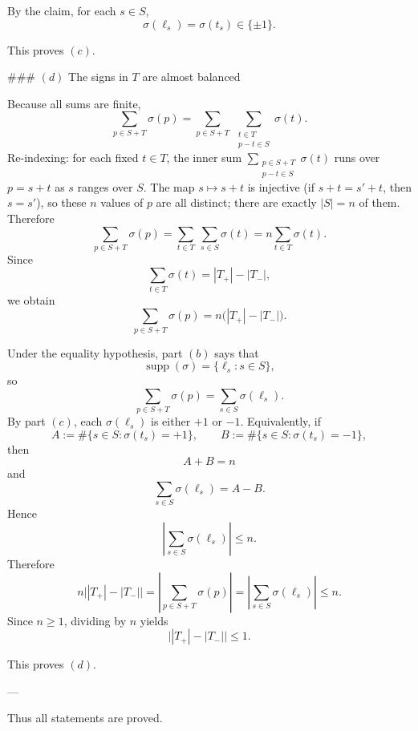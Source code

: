 By the claim, for each \(s\in S\),
\[
\sigma(\ell_s)=\sigma(t_s)\in\{\pm 1\}.
\]

This proves \((c)\).

### \((d)\) The signs in \(T\) are almost balanced

Because all sums are finite,
\[
\sum_{p\in S+T}\sigma(p)
=
\sum_{p\in S+T}\ \sum_{\substack{t\in T\\ p-t\in S}} \sigma(t).
\]
Re-indexing: for each fixed \(t\in T\), the inner sum \(\sum_{\substack{p\in S+T\\ p-t\in S}}\sigma(t)\) runs over \(p=s+t\) as \(s\) ranges over \(S\). The map \(s\mapsto s+t\) is injective (if \(s+t=s'+t\), then \(s=s'\)), so these \(n\) values of \(p\) are all distinct; there are exactly \(|S|=n\) of them. Therefore
\[
\sum_{p\in S+T}\sigma(p)
=
\sum_{t\in T}\ \sum_{s\in S}\sigma(t)
=
n\sum_{t\in T}\sigma(t).
\]
Since
\[
\sum_{t\in T}\sigma(t)=|T_+|-|T_-|,
\]
we obtain
\[
\sum_{p\in S+T}\sigma(p)=n\bigl(|T_+|-|T_-|\bigr).
\]

Under the equality hypothesis, part \((b)\) says that
\[
\operatorname{supp}(\sigma)=\{\ell_s:s\in S\},
\]
so
\[
\sum_{p\in S+T}\sigma(p)
=
\sum_{s\in S}\sigma(\ell_s).
\]
By part \((c)\), each \(\sigma(\ell_s)\) is either \(+1\) or \(-1\). Equivalently, if
\[
A:=\#\{s\in S:\sigma(t_s)=+1\},
\qquad
B:=\#\{s\in S:\sigma(t_s)=-1\},
\]
then
\[
A+B=n
\]
and
\[
\sum_{s\in S}\sigma(\ell_s)=A-B.
\]
Hence
\[
\left|\sum_{s\in S}\sigma(\ell_s)\right|\le n.
\]
Therefore
\[
n\bigl||T_+|-|T_-|\bigr|
=
\left|\sum_{p\in S+T}\sigma(p)\right|
=
\left|\sum_{s\in S}\sigma(\ell_s)\right|
\le n.
\]
Since \(n\ge 1\), dividing by \(n\) yields
\[
\bigl||T_+|-|T_-|\bigr|\le 1.
\]

This proves \((d)\).

---

Thus all statements are proved.